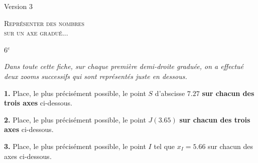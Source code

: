 \documentclass[a4paper,10pt,fleqn,twocolumn,landscape]{article}
\newcommand{\axesZoomBis}[5]{
{} \hfill 
\begin{tikzpicture}
	\def\XA{#1} %
	\def\Nom{#2} %
	\def\Xmin{#3} %
	\setboolean{affichePointilles}{true}  %
	\setboolean{affichePoint}{#4} %
	\setboolean{afficheGraduations}{#5} %
	\setboolean{demiDroite}{true} %
	
	
	\ifthenelse{\boolean{demiDroite}}
	{
		\def\DebordementAGauche{0} %
	}
	{
		\def\DebordementAGauche{0.5} %
	}	
	
	\pgfmathparse{int(\Xmin+10)}\let\Xmax\pgfmathresult; %
		
	\pgfmathparse{int(\XA)}\let\Unites\pgfmathresult;
	\pgfmathparse{int((\XA-\Unites)*10)}\let\Dixiemes\pgfmathresult;
	\pgfmathparse{int(round((\XA-\Unites.\Dixiemes)*100))}\let\Centiemes\pgfmathresult;	

	\pgfmathparse{int(\Unites+1)}\let\UnitesMaj\pgfmathresult;
	\pgfmathparse{int(\Dixiemes+1)}\let\DixiemesMaj\pgfmathresult;
	\pgfmathparse{int(\Centiemes+1)}\let\CentiemesMaj\pgfmathresult;				

	\pgfmathparse{\Xmax+1}\let\Xfleche\pgfmathresult;
	\ifthenelse{\equal{\Xmin}{0}}
	{
		\def\Xorigine{\Xmin} 	
	}
	{
		\pgfmathparse{\Xmin-0.5}\let\Xorigine\pgfmathresult;	
	}

	\pgfmathparse{int(\Xmax-1)}\let\XmaxMoinsUn\pgfmathresult;
	\pgfmathparse{int(\Xmin+1)}\let\XminPlusUn\pgfmathresult;
		
	
	\draw[->,>=latex] (\Xorigine,0) -- (\Xfleche,0);
	\foreach \x in {\XminPlusUn,...,\XmaxMoinsUn}{
		\ifthenelse{\boolean{afficheGraduations}}
		{
			\draw (\x,-.1) -- (\x,.1) node[above] {\x};
		}
		{
			\draw (\x,-.1) -- (\x,.1);
		}
	};
	\foreach \x in {1,...,9}{
		\draw (\Unites.\x,-.05) -- (\Unites.\x,.05);
	}
	\draw (\Xmin,-.1) -- (\Xmin,.1) node[above] {\Xmin};
	\draw (\Xmax,-.1) -- (\Xmax,.1) node[above] {\Xmax};
	\ifthenelse{\not\equal{\Unites}{0}}
	{
		\pgfmathparse{\Xmin-0.5}\let\Xorigine\pgfmathresult;		
	}{}
	\draw[->,>=latex] (\Xorigine,-2) -- (\Xfleche,-2);
	\foreach \x in {1,...,9}{
		\pgfmathparse{int(\Xmin+\x)}\let\X\pgfmathresult;
		\ifthenelse{\boolean{afficheGraduations}}
		{
			\draw (\X,-2.1) -- (\X,-1.9) node[above] {\Unites,\x};
		}
		{
			\draw (\X,-2.1) -- (\X,-1.9);
		}		
		\pgfmathparse{int(\Dixiemes+\Xmin)+\x/10}\let\Xtirets\pgfmathresult;
		\draw (\Xtirets,-2.05) -- (\Xtirets,-1.95);
	};
	
	\ifthenelse{\boolean{afficheGraduations}}
	{	
		\draw (\Xmax,-2.1) -- (\Xmax,-1.9) node[above] {\UnitesMaj};
		\draw (\Xmin,-2.1) -- (\Xmin,-1.9) node[above] {\Unites};
	}
	{
		\draw (\Xmax,-2.1) -- (\Xmax,-1.9) ;
		\draw (\Xmin,-2.1) -- (\Xmin,-1.9) ;		
	}
	
	\pgfmathparse{int(\Dixiemes+\Xmin)}\let\XGaucheAxeBis\pgfmathresult;
	\pgfmathparse{int(\XGaucheAxeBis+1)}\let\XDroitAxeBis\pgfmathresult;

	\ifthenelse{\boolean{affichePointilles}}
	{
	\draw[dashed] (\Unites,0) -- (\Xmin,-2);
	\draw[dashed] (\UnitesMaj,0) -- (\Xmax,-2);
	\draw[dashed] (\XGaucheAxeBis,-2) -- (\Xmin,-4);
	\draw[dashed] (\XDroitAxeBis,-2) -- (\Xmax,-4);
	}{}
	
	\ifthenelse{\not\equal{\Dixiemes}{0}}
	{
		\pgfmathparse{\Xmin-0.5}\let\Xorigine\pgfmathresult;		
	}{}
	\draw[->,>=latex] (\Xorigine,-4) -- (\Xfleche,-4);
	\foreach \x in {1,...,9}{
		\pgfmathparse{int(\Xmin+\x)}\let\X\pgfmathresult;
		\ifthenelse{\boolean{afficheGraduations}}
			{
			\draw (\X,-4.1) -- (\X,-3.9) node[above] {\Unites,\Dixiemes\x};
			}
			{
			\draw (\X,-4.1) -- (\X,-3.9) ;
			}
		};

	
\ifthenelse{\boolean{afficheGraduations}}
	{
	\ifthenelse{\equal{\Dixiemes}{9}}
		{
		\draw (\Xmax,-4.1) -- (\Xmax,-3.9) node[above] {\UnitesMaj};		
		}	
		{
		\draw (\Xmax,-4.1) -- (\Xmax,-3.9) node[above] {\Unites,\DixiemesMaj};
		}	
	
	\ifthenelse{\equal{\Dixiemes}{0}}
		{
		\draw (\Xmin,-4.1) -- (\Xmin,-3.9) node[above] {\Unites};
		}
		{
		\draw (\Xmin,-4.1) -- (\Xmin,-3.9) node[above] {\Unites,\Dixiemes};	
		}
	}
	{
	\ifthenelse{\equal{\Dixiemes}{9}}
		{
		\draw (\Xmax,-4.1) -- (\Xmax,-3.9);		
		}	
		{
		\draw (\Xmax,-4.1) -- (\Xmax,-3.9) ;
		}	
	
	\ifthenelse{\equal{\Dixiemes}{0}}
		{
		\draw (\Xmin,-4.1) -- (\Xmin,-3.9) ;
		}
		{
		\draw (\Xmin,-4.1) -- (\Xmin,-3.9) ;	
		}
	\pgfmathparse{int(\Centiemes+\Xmin)}\let\XGaucheAxeTer\pgfmathresult;
	\draw (\XGaucheAxeTer,-4.1) node[below] {\Nom};
	}
	
	\ifthenelse{\boolean{affichePoint}}
	{
		\draw (\XA,0) node[below] {\Nom};
		\draw (\XGaucheAxeBis.\Centiemes,-2.1) node[below] {\Nom};
	}{}
	
	\draw (7,0) node[below] {$D$};
	\draw (6,-2.1) node[below] {$E$};
\end{tikzpicture}
}
\newcommand{\axesZoomTer}[5]{
{} \hfill 
\begin{tikzpicture}
	\def\XA{#1} %
	\def\Nom{#2} %
	\def\Xmin{#3} %
	\setboolean{affichePointilles}{true}  %
	\setboolean{affichePoint}{#4} %
	\setboolean{afficheGraduations}{#5} %
	\setboolean{demiDroite}{true} %
	
	
	\ifthenelse{\boolean{demiDroite}}
	{
		\def\DebordementAGauche{0} %
	}
	{
		\def\DebordementAGauche{0.5} %
	}	
	
	\pgfmathparse{int(\Xmin+10)}\let\Xmax\pgfmathresult; %
		
	\pgfmathparse{int(\XA)}\let\Unites\pgfmathresult;
	\pgfmathparse{int((\XA-\Unites)*10)}\let\Dixiemes\pgfmathresult;
	\pgfmathparse{int(round((\XA-\Unites.\Dixiemes)*100))}\let\Centiemes\pgfmathresult;	

	\pgfmathparse{int(\Unites+1)}\let\UnitesMaj\pgfmathresult;
	\pgfmathparse{int(\Dixiemes+1)}\let\DixiemesMaj\pgfmathresult;
	\pgfmathparse{int(\Centiemes+1)}\let\CentiemesMaj\pgfmathresult;				

	\pgfmathparse{\Xmax+1}\let\Xfleche\pgfmathresult;
	\ifthenelse{\equal{\Xmin}{0}}
	{
		\def\Xorigine{\Xmin} 	
	}
	{
		\pgfmathparse{\Xmin-0.5}\let\Xorigine\pgfmathresult;	
	}

	\pgfmathparse{int(\Xmax-1)}\let\XmaxMoinsUn\pgfmathresult;
	\pgfmathparse{int(\Xmin+1)}\let\XminPlusUn\pgfmathresult;
		
	
	\draw[->,>=latex] (\Xorigine,0) -- (\Xfleche,0);
	\foreach \x in {\XminPlusUn,...,\XmaxMoinsUn}{
		\ifthenelse{\boolean{afficheGraduations}}
		{
			\draw (\x,-.1) -- (\x,.1) node[above] {\x};
		}
		{
			\draw (\x,-.1) -- (\x,.1);
		}
	};
	\foreach \x in {1,...,9}{
		\draw (\Unites.\x,-.05) -- (\Unites.\x,.05);
	}
	\draw (\Xmin,-.1) -- (\Xmin,.1) node[above] {\Xmin};
	\draw (\Xmax,-.1) -- (\Xmax,.1) node[above] {\Xmax};
	\ifthenelse{\not\equal{\Unites}{0}}
	{
		\pgfmathparse{\Xmin-0.5}\let\Xorigine\pgfmathresult;		
	}{}
	\draw[->,>=latex] (\Xorigine,-2) -- (\Xfleche,-2);
	\foreach \x in {1,...,9}{
		\pgfmathparse{int(\Xmin+\x)}\let\X\pgfmathresult;
		\ifthenelse{\boolean{afficheGraduations}}
		{
			\draw (\X,-2.1) -- (\X,-1.9) node[above] {\Unites,\x};
		}
		{
			\draw (\X,-2.1) -- (\X,-1.9);
		}		
		\pgfmathparse{int(\Dixiemes+\Xmin)+\x/10}\let\Xtirets\pgfmathresult;
		\draw (\Xtirets,-2.05) -- (\Xtirets,-1.95);
	};
	
	\ifthenelse{\boolean{afficheGraduations}}
	{	
		\draw (\Xmax,-2.1) -- (\Xmax,-1.9) node[above] {\UnitesMaj};
		\draw (\Xmin,-2.1) -- (\Xmin,-1.9) node[above] {\Unites};
	}
	{
		\draw (\Xmax,-2.1) -- (\Xmax,-1.9) ;
		\draw (\Xmin,-2.1) -- (\Xmin,-1.9) ;		
	}
	
	\pgfmathparse{int(\Dixiemes+\Xmin)}\let\XGaucheAxeBis\pgfmathresult;
	\pgfmathparse{int(\XGaucheAxeBis+1)}\let\XDroitAxeBis\pgfmathresult;

	\ifthenelse{\boolean{affichePointilles}}
	{
	\draw[dashed] (\Unites,0) -- (\Xmin,-2);
	\draw[dashed] (\UnitesMaj,0) -- (\Xmax,-2);
	\draw[dashed] (\XGaucheAxeBis,-2) -- (\Xmin,-4);
	\draw[dashed] (\XDroitAxeBis,-2) -- (\Xmax,-4);
	}{}
	
	\ifthenelse{\not\equal{\Dixiemes}{0}}
	{
		\pgfmathparse{\Xmin-0.5}\let\Xorigine\pgfmathresult;		
	}{}
	\draw[->,>=latex] (\Xorigine,-4) -- (\Xfleche,-4);
	\foreach \x in {1,...,9}{
		\pgfmathparse{int(\Xmin+\x)}\let\X\pgfmathresult;
		\ifthenelse{\boolean{afficheGraduations}}
			{
			\draw (\X,-4.1) -- (\X,-3.9) node[above] {\Unites,\Dixiemes\x};
			}
			{
			\draw (\X,-4.1) -- (\X,-3.9) ;
			}
		};

	
\ifthenelse{\boolean{afficheGraduations}}
	{
	\ifthenelse{\equal{\Dixiemes}{9}}
		{
		\draw (\Xmax,-4.1) -- (\Xmax,-3.9) node[above] {\UnitesMaj};		
		}	
		{
		\draw (\Xmax,-4.1) -- (\Xmax,-3.9) node[above] {\Unites,\DixiemesMaj};
		}	
	
	\ifthenelse{\equal{\Dixiemes}{0}}
		{
		\draw (\Xmin,-4.1) -- (\Xmin,-3.9) node[above] {\Unites};
		}
		{
		\draw (\Xmin,-4.1) -- (\Xmin,-3.9) node[above] {\Unites,\Dixiemes};	
		}
	}
	{
	\ifthenelse{\equal{\Dixiemes}{9}}
		{
		\draw (\Xmax,-4.1) -- (\Xmax,-3.9);		
		}	
		{
		\draw (\Xmax,-4.1) -- (\Xmax,-3.9) ;
		}	
	
	\ifthenelse{\equal{\Dixiemes}{0}}
		{
		\draw (\Xmin,-4.1) -- (\Xmin,-3.9) ;
		}
		{
		\draw (\Xmin,-4.1) -- (\Xmin,-3.9) ;	
		}
	\pgfmathparse{int(\Centiemes+\Xmin)}\let\XGaucheAxeTer\pgfmathresult;
	\draw (\XGaucheAxeTer,-4.1) node[below] {\Nom};
	}
	
	\ifthenelse{\boolean{affichePoint}}
	{
		\draw (\XA,0) node[below] {\Nom};
		\draw (\XGaucheAxeBis.\Centiemes,-2.1) node[below] {\Nom};
	}{}
	
	\draw (10,0) node[below] {$G$};
	\draw (5,-2.1) node[below] {$H$};
	\draw (11,-4.1) node[below] {$I$};
\end{tikzpicture}
}
\newcommand{\axesZoomTerBis}[5]{
{} \hfill 
\begin{tikzpicture}
	\def\XA{#1} %
	\def\Nom{#2} %
	\def\Xmin{#3} %
	\setboolean{affichePointilles}{true}  %
	\setboolean{affichePoint}{#4} %
	\setboolean{afficheGraduations}{#5} %
	\setboolean{demiDroite}{true} %
	
	
	\ifthenelse{\boolean{demiDroite}}
	{
		\def\DebordementAGauche{0} %
	}
	{
		\def\DebordementAGauche{0.5} %
	}	
	
	\pgfmathparse{int(\Xmin+10)}\let\Xmax\pgfmathresult; %
		
	\pgfmathparse{int(\XA)}\let\Unites\pgfmathresult;
	\pgfmathparse{int((\XA-\Unites)*10)}\let\Dixiemes\pgfmathresult;
	\pgfmathparse{int(round((\XA-\Unites.\Dixiemes)*100))}\let\Centiemes\pgfmathresult;	

	\pgfmathparse{int(\Unites+1)}\let\UnitesMaj\pgfmathresult;
	\pgfmathparse{int(\Dixiemes+1)}\let\DixiemesMaj\pgfmathresult;
	\pgfmathparse{int(\Centiemes+1)}\let\CentiemesMaj\pgfmathresult;				

	\pgfmathparse{\Xmax+1}\let\Xfleche\pgfmathresult;
	\ifthenelse{\equal{\Xmin}{0}}
	{
		\def\Xorigine{\Xmin} 	
	}
	{
		\pgfmathparse{\Xmin-0.5}\let\Xorigine\pgfmathresult;	
	}

	\pgfmathparse{int(\Xmax-1)}\let\XmaxMoinsUn\pgfmathresult;
	\pgfmathparse{int(\Xmin+1)}\let\XminPlusUn\pgfmathresult;
		
	
	\draw[->,>=latex] (\Xorigine,0) -- (\Xfleche,0);
	\foreach \x in {\XminPlusUn,...,\XmaxMoinsUn}{
		\ifthenelse{\boolean{afficheGraduations}}
		{
			\draw (\x,-.1) -- (\x,.1) node[above] {\x};
		}
		{
			\draw (\x,-.1) -- (\x,.1);
		}
	};
	\foreach \x in {1,...,9}{
		\draw (\Unites.\x,-.05) -- (\Unites.\x,.05);
	}
	\draw (\Xmin,-.1) -- (\Xmin,.1) node[above] {\Xmin};
	\draw (\Xmax,-.1) -- (\Xmax,.1) node[above] {\Xmax};
	\ifthenelse{\not\equal{\Unites}{0}}
	{
		\pgfmathparse{\Xmin-0.5}\let\Xorigine\pgfmathresult;		
	}{}
	\draw[->,>=latex] (\Xorigine,-2) -- (\Xfleche,-2);
	\foreach \x in {1,...,9}{
		\pgfmathparse{int(\Xmin+\x)}\let\X\pgfmathresult;
		\ifthenelse{\boolean{afficheGraduations}}
		{
			\draw (\X,-2.1) -- (\X,-1.9) node[above] {\Unites,\x};
		}
		{
			\draw (\X,-2.1) -- (\X,-1.9);
		}		
		\pgfmathparse{int(\Dixiemes+\Xmin)+\x/10}\let\Xtirets\pgfmathresult;
		\draw (\Xtirets,-2.05) -- (\Xtirets,-1.95);
	};
	
	\ifthenelse{\boolean{afficheGraduations}}
	{	
		\draw (\Xmax,-2.1) -- (\Xmax,-1.9) node[above] {\UnitesMaj};
		\draw (\Xmin,-2.1) -- (\Xmin,-1.9) node[above] {\Unites};
	}
	{
		\draw (\Xmax,-2.1) -- (\Xmax,-1.9) ;
		\draw (\Xmin,-2.1) -- (\Xmin,-1.9) ;		
	}
	
	\pgfmathparse{int(\Dixiemes+\Xmin)}\let\XGaucheAxeBis\pgfmathresult;
	\pgfmathparse{int(\XGaucheAxeBis+1)}\let\XDroitAxeBis\pgfmathresult;

	\ifthenelse{\boolean{affichePointilles}}
	{
	\draw[dashed] (\Unites,0) -- (\Xmin,-2);
	\draw[dashed] (\UnitesMaj,0) -- (\Xmax,-2);
	\draw[dashed] (\XGaucheAxeBis,-2) -- (\Xmin,-4);
	\draw[dashed] (\XDroitAxeBis,-2) -- (\Xmax,-4);
	}{}
	
	\ifthenelse{\not\equal{\Dixiemes}{0}}
	{
		\pgfmathparse{\Xmin-0.5}\let\Xorigine\pgfmathresult;		
	}{}
	\draw[->,>=latex] (\Xorigine,-4) -- (\Xfleche,-4);
	\foreach \x in {1,...,9}{
		\pgfmathparse{int(\Xmin+\x)}\let\X\pgfmathresult;
		\ifthenelse{\boolean{afficheGraduations}}
			{
			\draw (\X,-4.1) -- (\X,-3.9) node[above] {\Unites,\Dixiemes\x};
			}
			{
			\draw (\X,-4.1) -- (\X,-3.9) ;
			}
		};

	
\ifthenelse{\boolean{afficheGraduations}}
	{
	\ifthenelse{\equal{\Dixiemes}{9}}
		{
		\draw (\Xmax,-4.1) -- (\Xmax,-3.9) node[above] {\UnitesMaj};		
		}	
		{
		\draw (\Xmax,-4.1) -- (\Xmax,-3.9) node[above] {\Unites,\DixiemesMaj};
		}	
	
	\ifthenelse{\equal{\Dixiemes}{0}}
		{
		\draw (\Xmin,-4.1) -- (\Xmin,-3.9) node[above] {\Unites};
		}
		{
		\draw (\Xmin,-4.1) -- (\Xmin,-3.9) node[above] {\Unites,\Dixiemes};	
		}
	}
	{
	\ifthenelse{\equal{\Dixiemes}{9}}
		{
		\draw (\Xmax,-4.1) -- (\Xmax,-3.9);		
		}	
		{
		\draw (\Xmax,-4.1) -- (\Xmax,-3.9) ;
		}	
	
	\ifthenelse{\equal{\Dixiemes}{0}}
		{
		\draw (\Xmin,-4.1) -- (\Xmin,-3.9) ;
		}
		{
		\draw (\Xmin,-4.1) -- (\Xmin,-3.9) ;	
		}
	\pgfmathparse{int(\Centiemes+\Xmin)}\let\XGaucheAxeTer\pgfmathresult;
	\draw (\XGaucheAxeTer,-4.1) node[below] {\Nom};
	}
	
	\ifthenelse{\boolean{affichePoint}}
	{
		\draw (\XA,0) node[below] {\Nom};
		\draw (\XGaucheAxeBis.\Centiemes,-2.1) node[below] {\Nom};
	}{}
	
	\draw (25,0) node[below] {$L$};
	\draw (18,-2.1) node[below] {$M$};
	\draw (24,-4.1) node[below] {$N$};
\end{tikzpicture}
}
\begin{document}
\vfill
\newpage
\setcounter{section}{0}
\setcounter{exo}{0}   	

\begin{minipage}{0.15\linewidth}
Version 3
\end{minipage}\hfill
\begin{minipage}{0.75\linewidth}
\begin{center}
	\textsc{\Large{Représenter des nombres\\ sur un axe gradué...}}
\end{center}
\end{minipage}\hfill
\begin{minipage}{0.1\linewidth}
{} \hfill 6$^e$
\end{minipage}

\medskip

\textit{Dans toute cette fiche, sur chaque première demi-droite graduée, on a effectué deux zooms successifs qui sont représentés juste en dessous.}

\vfill




\textbf{1.} Place, le plus précisément possible, le point $S$ d'abscisse $7.27$ \textbf{sur chacun des trois axes} ci-dessous.

\vfill

{} \hfill 
{}
\hfill {}

\vfill

\textbf{2.} Place, le plus précisément possible, le point $J (3.65)$ \textbf{sur chacun des trois axes} ci-dessous.

\vfill

{} \hfill 
{}
\hfill {}

\vfill

\textbf{3.} Place, le plus précisément possible, le point $I$ tel que $x_{I}=5.66$ sur chacun des axes ci-dessous.

\vfill

{} \hfill 
{}
\hfill {}

\vfill


%
%
%
%
%
%
%
%
%
%
%
%
%
\end{document}
